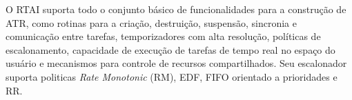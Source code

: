 O RTAI suporta todo o conjunto básico de funcionalidades para a construção de ATR, como rotinas para a criação, destruição, suspensão, sincronia e comunicação entre tarefas, temporizadores com alta resolução, políticas de escalonamento, capacidade de execução de tarefas de tempo real no espaço do usuário e mecanismos para controle de recursos compartilhados. Seu escalonador suporta politicas \textit{Rate Monotonic} (RM), EDF, FIFO orientado a prioridades e RR.